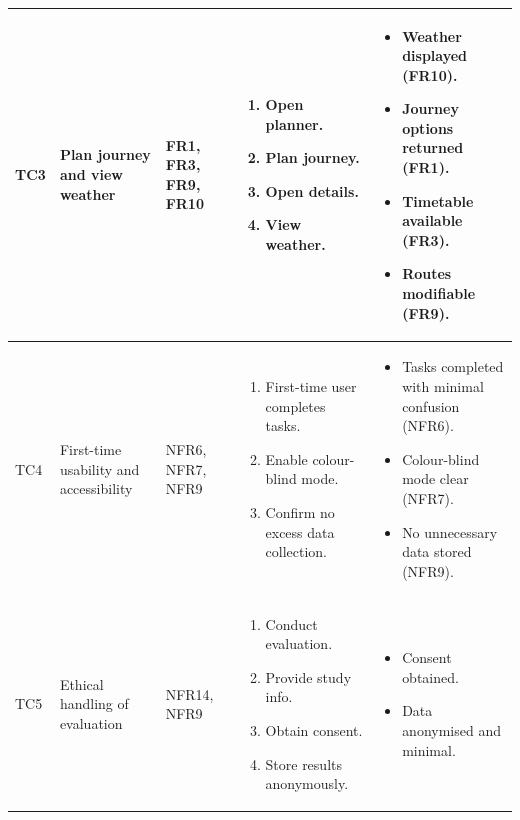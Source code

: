 \documentclass{article}
\begin{document}
\begin{table}[H]
\begin{tabularx}{\textwidth}{|l|X|X|X|X|}
TC3 &
Plan journey and view weather &
FR1, FR3, FR9, FR10 &
\begin{enumerate}[nosep,leftmargin=*]
\item Open planner.
\item Plan journey.
\item Open details.
\item View weather.
\end{enumerate}
&
\begin{itemize}[nosep,leftmargin=*]
\item Weather displayed (FR10).
\item Journey options returned (FR1).
\item Timetable available (FR3).
\item Routes modifiable (FR9).
\end{itemize}
\\
\hline

TC4 &
First-time usability and accessibility &
NFR6, NFR7, NFR9 &
\begin{enumerate}[nosep,leftmargin=*]
\item First-time user completes tasks.
\item Enable colour-blind mode.
\item Confirm no excess data collection.
\end{enumerate}
&
\begin{itemize}[nosep,leftmargin=*]
\item Tasks completed with minimal confusion (NFR6).
\item Colour-blind mode clear (NFR7).
\item No unnecessary data stored (NFR9).
\end{itemize}
\\
\hline

TC5 &
Ethical handling of evaluation &
NFR14, NFR9 &
\begin{enumerate}[nosep,leftmargin=*]
\item Conduct evaluation.
\item Provide study info.
\item Obtain consent.
\item Store results anonymously.
\end{enumerate}
&
\begin{itemize}[nosep,leftmargin=*]
\item Consent obtained.
\item Data anonymised and minimal.
\end{itemize}
\\
\hline


\end{tabularx}
\end{table}
\end{document}
